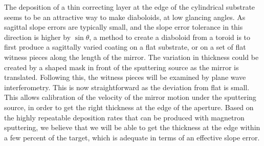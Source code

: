 \documentclass{iucr}       %
\begin{document}
The deposition of a thin correcting layer at the edge of the cylindrical substrate seems to be an attractive way to make diaboloids, at low glancing angles. %
As sagittal slope errors are typically small, and the slope error tolerance in this direction is higher by $\sin\theta$, a method to create a diaboloid from a toroid is to first produce a sagittally varied coating on a flat substrate, or on a set of flat witness pieces along the length of the mirror. The variation in thickness could be created by a shaped mask in front of the sputtering source as the mirror is translated. Following this, the witness pieces will be examined by plane wave interferometry. This is now straightforward as the deviation from flat is small.
This allows calibration of the velocity of the mirror motion under the sputtering source, in order to get the right thickness at the edge of the aperture. Based on the highly repeatable deposition rates that can be produced with magnetron sputtering, we believe that we will be able to get the thickness at the edge within a few percent of the target, which is adequate in terms of an effective slope error. 
\end{document}
